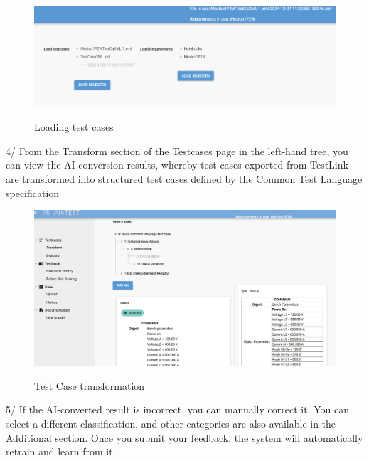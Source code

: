 \begin{figure}[H]
    \begin{center}
        \includegraphics[width=.95\linewidth]{res/ai4test-history2.png}\\
        \caption{Loading test cases}\label{ai4test-history2}
    \end{center}
\end{figure}

4/  From the Transform section of the Testcases page in the left‑hand tree, you can view the AI conversion results, whereby test cases exported from TestLink are transformed into structured test cases defined by the Common Test Language specification

\begin{figure}[H]
    \begin{center}
        \includegraphics[width=.95\linewidth]{res/ai4test-transformcase.png}\\
        \caption{Test Case transformation }\label{ai4test-transformcase}
    \end{center}
\end{figure}

5/  If the AI‑converted result is incorrect, you can manually correct it.
You can select a different classification, and other categories are also available in the Additional section. Once you submit your feedback, the system will automatically retrain and learn from it.

